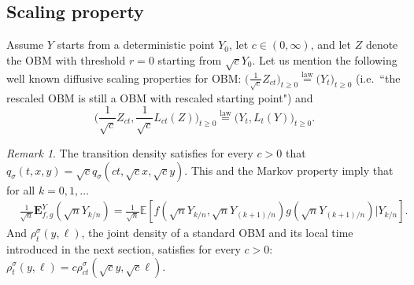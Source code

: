 \documentclass[12pt]{article}
\numberwithin{equation}{section}
\theoremstyle{definition}
\theoremstyle{remark}
\newtheorem{remark}{Remark}
\newcommand{\EE}{\mathbb{E}}
\newcommand{\vd}{\,\mathrm{d}}
\newcommand{\bfH}[1]{\mathbf{E}^Y_{#1}}
\def\eqlaw{\stackrel{\mathrm{law}}{=}}
\begin{document}
\subsection{Scaling property} \label{sec:scaling}
%
%
Assume $Y$ starts 
from a deterministic point $Y_0$, let $c\in (0,\infty)$,
and let $Z$ denote the OBM with threshold $r=0$ starting from $\sqrt{c} Y_0$.
%
Let us mention the following well known diffusive scaling properties for OBM:
$
\bigg(\frac{1}{\sqrt{c}} Z_{ct} \bigg)_{t\geq 0} \eqlaw \big( Y_{t}\big)_{t\geq 0} 
$
(i.e.~``the rescaled OBM is still a OBM with rescaled starting point")
%
%
and
\begin{equation}\label{Yscaling}
\bigg(\frac{1}{\sqrt{c}} Z_{ct} , \frac{1}{\sqrt{c}} L_{ct}(Z)\bigg)_{t\geq 0} \eqlaw \big( Y_{t}, L_t(Y) \big)_{t\geq 0}.
\end{equation} 
%
%
\begin{remark}
The transition density satisfies for every $c>0$ that $q_\sigma(t,x,y)= \sqrt{c} q_\sigma(c t, \sqrt{c} x, \sqrt{c} y ).$
This and the Markov property imply that for all $k =0,1,\ldots$
\[
\begin{split} 
	& \frac{1}{\sqrt{n}}\bfH{f,g}(\sqrt{n}Y_{k/n}) 
	= \frac1{\sqrt n}  \EE\!\left[ f(\sqrt{n} Y_{k/n}, \sqrt{n} Y_{(k+1)/n}) g(\sqrt{n} Y_{(k+1)/n}) | Y_{k/n} \right].
\end{split}
\]
And $\rho^\sigma_t(y,\ell)$, the joint density of a standard OBM and its local time introduced in the next section, satisfies for every $c>0$: $\rho^\sigma_t(y,\ell) = c \rho^\sigma_{c t}(\sqrt c y, \sqrt c \ell)$.
\end{remark}
\end{document}
